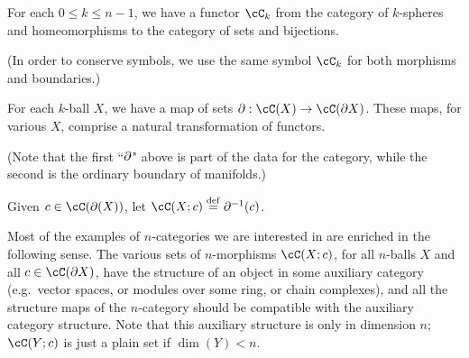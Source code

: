\begin{axiom}
For each $0 \le k \le n-1$, we have a functor $\cC_k$ from 
the category of $k$-spheres and 
homeomorphisms to the category of sets and bijections.
\end{axiom}

(In order to conserve symbols, we use the same symbol $\cC_k$ for both morphisms and boundaries.)

\begin{axiom}
For each $k$-ball $X$, we have a map of sets $\bd: \cC(X)\to \cC(\bd X)$.
These maps, for various $X$, comprise a natural transformation of functors.
\end{axiom}

(Note that the first ``$\partial$" above is part of the data for the category, 
while the second is the ordinary boundary of manifolds.)

Given $c\in\cC(\bd(X))$, let $\cC(X; c) \deq \bd^{-1}(c)$.

Most of the examples of $n$-categories we are interested in are enriched in the following sense.
The various sets of $n$-morphisms $\cC(X; c)$, for all $n$-balls $X$ and
all $c\in \cC(\bd X)$, have the structure of an object in some auxiliary category
(e.g.\ vector spaces, or modules over some ring, or chain complexes),
and all the structure maps of the $n$-category should be compatible with the auxiliary
category structure.
Note that this auxiliary structure is only in dimension $n$;
$\cC(Y; c)$ is just a plain set if $\dim(Y) < n$.

\medskip
{}
\medskip


